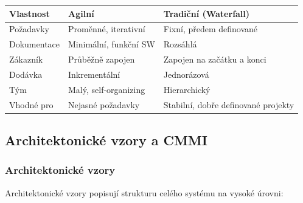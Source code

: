\begin{center}
\begin{tabular}{lll}
\toprule
\textbf{Vlastnost} & \textbf{Agilní} & \textbf{Tradiční (Waterfall)} \\
\midrule
Požadavky & Proměnné, iterativní & Fixní, předem definované \\
Dokumentace & Minimální, funkční SW & Rozsáhlá \\
Zákazník & Průběžně zapojen & Zapojen na začátku a konci \\
Dodávka & Inkrementální & Jednorázová \\
Tým & Malý, self-organizing & Hierarchický \\
Vhodné pro & Nejasné požadavky & Stabilní, dobře definované projekty \\
\bottomrule
\end{tabular}
\end{center}

\subsection{Architektonické vzory a CMMI}

\subsubsection{Architektonické vzory}

Architektonické vzory popisují strukturu celého systému na vysoké úrovni:

